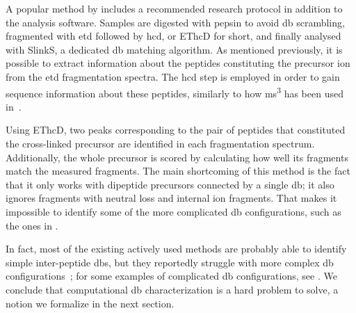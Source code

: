 A popular method by \citet{liu2014facilitating} includes a recommended research protocol in addition to the analysis software. Samples are digested with pepsin to avoid \gls*{db} scrambling, fragmented with \gls*{etd} followed by \gls*{hcd}, or EThcD for short, and finally analysed with SlinkS, a dedicated \gls*{db} matching algorithm. As mentioned previously, it is possible to extract information about the peptides constituting the precursor ion from the \gls*{etd} fragmentation spectra. The \gls*{hcd} step is employed in order to gain sequence information about these peptides, similarly to how \gls*{ms}\textsuperscript{3} has been used in~\cite{wu2009mass}.

Using EThcD, two peaks corresponding to the pair of peptides that constituted the cross-linked precursor are identified in each fragmentation spectrum. Additionally, the whole precursor is scored by calculating how well its fragments match the measured fragments. The main shortcoming of this method is the fact that it only works with dipeptide precursors connected by a single \gls*{db}; it also ignores fragments with neutral loss and internal ion fragments. That makes it impossible to identify some of the more complicated \gls*{db} configurations, such as the ones in .

In fact, most of the existing actively used methods are probably able to identify simple inter-peptide \glspl*{db}, but they reportedly struggle with more complex \gls*{db} configurations~\cite{lakbub2018recent}; for some examples of complicated \gls*{db} configurations, see . We conclude that computational \gls*{db} characterization is a hard problem to solve, a notion we formalize in the next section.

